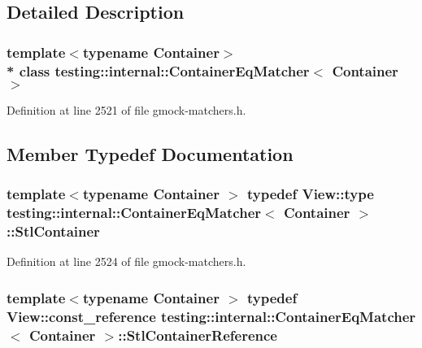 \subsection{Detailed Description}
\subsubsection*{template$<$typename Container$>$\\*
class testing\+::internal\+::\+Container\+Eq\+Matcher$<$ Container $>$}



Definition at line 2521 of file gmock-\/matchers.\+h.



\subsection{Member Typedef Documentation}
\subsubsection[{\texorpdfstring{Stl\+Container}{StlContainer}}]{\setlength{\rightskip}{0pt plus 5cm}template$<$typename Container $>$ typedef {\bf View\+::type} {\bf testing\+::internal\+::\+Container\+Eq\+Matcher}$<$ Container $>$\+::{\bf Stl\+Container}}\hypertarget{classtesting_1_1internal_1_1_container_eq_matcher_a8352d0190c372578d9a9a8457e0810db}{}\label{classtesting_1_1internal_1_1_container_eq_matcher_a8352d0190c372578d9a9a8457e0810db}


Definition at line 2524 of file gmock-\/matchers.\+h.

\subsubsection[{\texorpdfstring{Stl\+Container\+Reference}{StlContainerReference}}]{\setlength{\rightskip}{0pt plus 5cm}template$<$typename Container $>$ typedef {\bf View\+::const\+\_\+reference} {\bf testing\+::internal\+::\+Container\+Eq\+Matcher}$<$ Container $>$\+::{\bf Stl\+Container\+Reference}}\hypertarget{classtesting_1_1internal_1_1_container_eq_matcher_aaaeaacf0c557fe701a83e108d47edb23}{}\label{classtesting_1_1internal_1_1_container_eq_matcher_aaaeaacf0c557fe701a83e108d47edb23}


